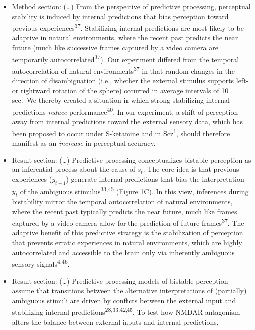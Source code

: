 \documentclass[
]{article}
\begin{document}
\begin{itemize}
\item
  Method section: (\ldots) From the perspective of predictive
  processing, perceptual stability is induced by internal predictions
  that bias perception toward previous experiences\textsuperscript{37}.
  Stabilizing internal predictions are most likely to be adaptive in
  natural environments, where the recent past predicts the near future
  (much like successive frames captured by a video camera are
  temporarily autocorrelated\textsuperscript{37}). Our experiment
  differed from the temporal autocorrelation of natural
  environments\textsuperscript{37} in that random changes in the
  direction of disambiguation (i.e., whether the external stimulus
  supports left- or rightward rotation of the sphere) occurred in
  average intervals of 10 sec.~We thereby created a situation in which
  strong stabilizing internal predictions \emph{reduce}
  performance\textsuperscript{40}. In our experiment, a shift of
  perception away from internal predictions toward the external sensory
  data, which has been proposed to occur under S-ketamine and in
  Scz\textsuperscript{1}, should therefore manifest as an
  \emph{increase} in perceptual accuracy.
\item
  Result section: (\ldots) Predictive processing conceptualizes bistable
  perception as an inferential process about the cause of \(s_t\). The
  core idea is that previous experiences (\(y_{t-1}\)) generate internal
  predictions that bias the interpretation \(y_t\) of the ambiguous
  stimulus\textsuperscript{33,45} (Figure 1C). In this view, inferences
  during bistability mirror the temporal autocorrelation of natural
  environments, where the recent past typically predicts the near
  future, much like frames captured by a video camera allow for the
  prediction of future frames\textsuperscript{37}. The adaptive benefit
  of this predictive strategy is the stabilization of perception that
  prevents erratic experiences in natural environments, which are highly
  autocorrelated and accessible to the brain only via inherently
  ambiguous sensory signals\textsuperscript{4,46}.
\item
  Result section: (\ldots) Predictive processing models of bistable
  perception assume that transitions between the alternative
  interpretations of (partially) ambiguous stimuli are driven by
  conflicts between the external input and stabilizing internal
  predictions\textsuperscript{28,33,42,45}. To test how NMDAR antagonism
  alters the balance between external inputs and internal predictions,

\end{itemize}
\end{document}
